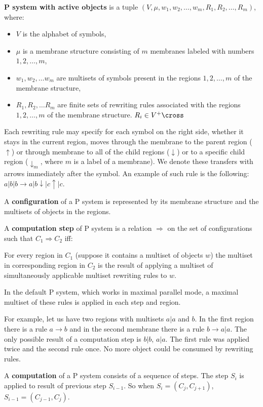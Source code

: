 {\bf P system with active objects} is a tuple $(V, \mu, w_1, w_2,\dots , w_m, R_1, R_2, \dots , R_m)$, where:
\begin{itemize}
  \item $V$ is the alphabet of symbols,
  \item $\mu$ is a membrane structure consisting of $m$ membranes labeled with numbers $1,2,\dots,m$,
  \item $w_1,w_2,\dots w_m$ are multisets of symbols present in the regions $1,2,\dots,m$ of the membrane structure,
  \item $R_1,R_2,\dots R_m$ are finite sets of rewriting rules associated with the regions $1,2,\dots,m$ of the membrane structure. $R_i\in V^+\cross$
\end{itemize}

Each rewriting rule may specify for each symbol on the right side, whether it stays in the current region, moves through the membrane to the parent region ($\uparrow$)
or through membrane to all of the child regions ($\downarrow$)
or to a specific child region ($\downarrow_m$, where $m$ is a label of a membrane).
We denote these transfers with arrows immediately after the symbol.
An example of such rule is the following: $a|b|b\rightarrow a|b\downarrow |c\uparrow|c$.

A {\bf configuration} of a P system is represented by its membrane structure and the multisets of objects in the regions.

A {\bf computation step} of P system is a relation $\Rightarrow$ on the set of configurations such that $C_1 \Rightarrow C_2$ iff:

For every region in $C_1$ (suppose it contains a multiset of objects $w$) the multiset in corresponding region in $C_2$ is the result of applying a multiset of simultaneously applicable multiset rewriting rules to $w$.

In the default P system, which works in maximal parallel mode, a maximal multiset of these rules is applied in each step and region.

For example, let us have two regions with multisets $a|a$ and $b$. In the first region there is a rule $a\rightarrow b$ and in the second membrane there is a rule $b\rightarrow a|a$. The only possible result of a computation step is $b|b$, $a|a$. The first rule was applied twice and the second rule once. No more object could be consumed by rewriting rules.

A {\bf computation} of a P system consists of a sequence of steps. The step $S_i$ is applied to result of previous step $S_{i-1}$. So when $S_i = (C_j,C_{j+1})$, $S_{i-1} = (C_{j-1},C_j)$.

